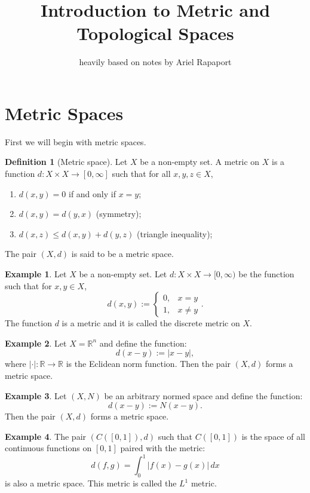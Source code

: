 \documentclass[11pt,a4paper]{article}
\title{\textbf{Introduction to Metric and Topological Spaces}}
\author{heavily based on notes by Ariel Rapaport}
\date{}
\theoremstyle{definition}
\newtheorem{definition}{Definition}[section]
\newtheorem{example}{Example}[section]
\theoremstyle{plain}
\newcommand{\R}{\mathbb{R}}
\newcommand{\abs}[1]{\left\lvert #1\right\rvert}
\begin{document}
  \maketitle
  \newpage
  \section{Metric Spaces}\label{sec:metric-spaces}
  First we will begin with metric spaces.
  \begin{definition}[Metric space]
  Let $X$ be a non-empty set. A metric on $X$ is a function 
  $d \colon X \times X \to [0,\infty]$ such that for all $x,y,z \in X$,
  \end{definition}
  \begin{enumerate}
    \item[(1)] $d(x,y) = 0$ if and only if $x = y$;
    \item[(2)] $d(x,y) = d(y,x)$ (symmetry);
    \item[(3)] $d(x,z) \le d(x,y) + d(y,z)$ (triangle inequality);
  \end{enumerate}
  The pair $(X,d)$ is said to be a metric space.
  \begin{example}
  Let $X$ be a non-empty set. Let $d \colon X \times X \to [0,\infty)$ be
  the function such that for $x,y \in X$,
  \[
    d(x,y) := \begin{cases}
      0, & x=y \\
      1, & x \neq y
    \end{cases}.
  \]
  The function $d$ is a metric and it is called the discrete metric on $X$.
  \end{example}
  \begin{example}
  Let $X = \R^n$ and define the function:
  \[
    d(x - y) := \abs{x - y},
  \]
  where $\abs{\cdot} \colon \R \to \R$ is the Eclidean norm function. 
  Then the pair $(X, d)$ forms a metric space.
  \end{example}
  \begin{example}
  Let $(X, N)$ be an arbitrary normed space and define the function:
  \[
    d(x - y) := N(x - y).
  \] 
  Then the pair $(X, d)$ forms a metric space.
  \end{example}
  \begin{example}
  The pair $(C\left([0,1]\right), d)$ such that $C([0,1])$ is the space of 
  all continuous functions on $[0,1]$ paired with the metric:
  \[
    d(f,g) = \int_{0}^{1}{\abs{f(x) - g(x)}\,dx}
  \]
  is also a metric space. This metric is called the $L^1$ metric.
  \end{example}
  
\end{document}
